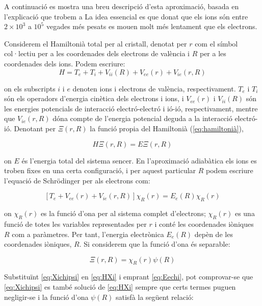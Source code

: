 \documentclass[12pt]{article} %
\begin{document}
A continuació es mostra una breu descripció d'esta aproximació, basada en l'explicació que trobem a \cite{brueesch82_phonon}
La idea essencial es que donat que els ions són entre $2\times 10^3$ a $10^5$ vegades més pesats es mouen molt més lentament que els electrons.

Considerem el Hamiltonià total per al cristall, denotat per $r$ com el símbol col·lectiu per a les coordenades dels electrons de valència i $R$ per a les coordenades dels ions. Podem escriure:
\begin{equation}
\label{eq:hamiltonià}
 H=T_e+T_i+V_{ii}(R)+V_{ee}(r)+V_{ie}(r,R)
\end{equation}

on els subscripts $i$ i $e$ denoten ions i electrons de valència, respectivament. $T_e$ i $T_i$ són els operadors d'energia cinètica dels electrons i ions, i $V_{ee}(r)$ i $V_{ii}(R)$ són les energies potencials de interacció electró-electró i ió-ió, respectivament, mentre que $V_{ie}(r,R)$ dóna compte de l'energia potencial deguda a la interacció electró-ió. Denotant per $\Xi(r,R)$ la funció propia del Hamiltonià (\ref{eq:hamiltonià}),

\begin{equation}
\label{eq:HXi}
 H\Xi(r,R)=E\Xi(r,R)
\end{equation}

on $E$ és l'energia total del sistema sencer. En l'aproximació adiabàtica els ions es troben fixes en una certa configuració, i per aquest particular $R$ podem escriure l'equació de Schrödinger per als electrons com:

\begin{equation}
\label{eq:Eechi}
 \left[T_e+V_{ee}(r) + V_{ie}(r,R)\right]\chi_R(r)=E_e(R)\chi_R(r)
\end{equation}

on $\chi_R(r)$ es la funció d'ona per al sistema complet d'electrons; $\chi_R(r)$ es una funció de totes les variables representades per $r$ i conté les coordenades iòniques $R$ com a paràmetres. Per tant, l'energia electrònica $E_e(R)$ depèn de les coordenades iòniques, $R$.
Si considerem que la funció d'ona és separable:

\begin{equation}
\label{eq:Xichipsi}
 \Xi(r,R)=\chi_R(r)\psi(R)
\end{equation}

Substituïnt \ref{eq:Xichipsi} en \ref{eq:HXi} i emprant \ref{eq:Eechi}, pot comprovar-se que \ref{eq:Xichipsi} es també solució de \ref{eq:HXi} sempre que certs termes puguen negligir-se i la funció d'ona $\psi(R)$ satisfà la següent relació:
\end{document}
